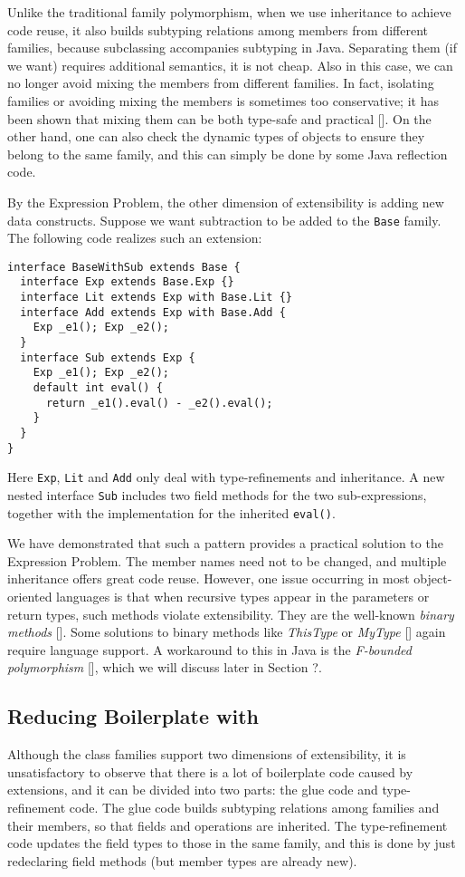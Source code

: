 Unlike the traditional family polymorphism, when we use inheritance to achieve code reuse, it also builds subtyping relations
among members from different families, because subclassing accompanies subtyping in Java. Separating them (if we want) requires
additional semantics, it is not cheap. Also in this case, we can no longer avoid mixing the members from different families.
In fact, isolating families or avoiding mixing the members is sometimes too conservative; it has been shown that mixing them can
be both type-safe and practical []. On the other hand, one can also check the dynamic types of objects to ensure they belong to
the same family, and this can simply be done by some Java reflection code.

By the Expression Problem, the other dimension of extensibility is adding new data constructs. Suppose we want subtraction to be added
to the \lstinline|Base| family. The following code realizes such an extension:

\begin{lstlisting}
interface BaseWithSub extends Base {
  interface Exp extends Base.Exp {}
  interface Lit extends Exp with Base.Lit {}
  interface Add extends Exp with Base.Add {
    Exp _e1(); Exp _e2();
  }
  interface Sub extends Exp {
    Exp _e1(); Exp _e2();
    default int eval() {
      return _e1().eval() - _e2().eval();
    }
  }
}
\end{lstlisting}
Here \lstinline|Exp|, \lstinline|Lit| and \lstinline|Add| only deal with type-refinements and inheritance. A
new nested interface \lstinline|Sub| includes two field methods for the two sub-expressions, together with
the implementation for the inherited \lstinline|eval()|.

We have demonstrated that such a pattern provides a practical solution to the Expression Problem. The member
names need not to be changed, and multiple inheritance offers great code reuse. However, one issue occurring
in most object-oriented languages is that when recursive types appear in the parameters or return types,
such methods violate extensibility. They are the well-known \textit{binary methods} []. Some solutions to binary methods
like \textit{ThisType} or \textit{MyType} [] again require language support. A workaround to this in Java
is the \textit{F-bounded polymorphism} [], which we will discuss later in Section ?.

\subsection{Reducing Boilerplate with \name}
Although the class families support two dimensions of extensibility, it is unsatisfactory to observe that there is a lot
of boilerplate code caused by extensions, and it can be divided into two parts: the glue code and type-refinement code.
The glue code builds subtyping relations among families and their members, so that fields and operations are inherited.
The type-refinement code updates the field types to those in the same family, and this is done by just redeclaring field
methods (but member types are already new).

